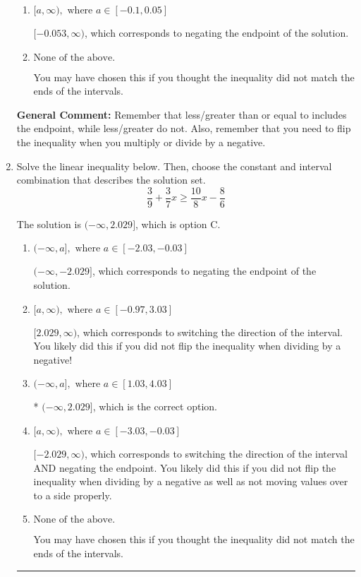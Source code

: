 \documentclass{extbook}[14pt]
\newcommand{\litem}[1]{\item #1

\rule{\textwidth}{0.4pt}}
\begin{document}
\begin{enumerate}
{\begin{enumerate}[label=\Alph*.]
 $(-\infty, -0.053]$, which corresponds to switching the direction of the interval AND negating the endpoint. You likely did this if you did not flip the inequality when dividing by a negative as well as not moving values over to a side properly.
\item \( [a, \infty), \text{ where } a \in [-0.1, 0.05] \)

 $[-0.053, \infty)$, which corresponds to negating the endpoint of the solution.
\item \( \text{None of the above}. \)

You may have chosen this if you thought the inequality did not match the ends of the intervals.
\end{enumerate}

\textbf{General Comment:} Remember that less/greater than or equal to includes the endpoint, while less/greater do not. Also, remember that you need to flip the inequality when you multiply or divide by a negative.
}
\litem{
Solve the linear inequality below. Then, choose the constant and interval combination that describes the solution set.
\[ \frac{3}{9} + \frac{3}{7} x \geq \frac{10}{8} x - \frac{8}{6} \]

The solution is \( (-\infty, 2.029] \), which is option C.\begin{enumerate}[label=\Alph*.]
\item \( (-\infty, a], \text{ where } a \in [-2.03, -0.03] \)

 $(-\infty, -2.029]$, which corresponds to negating the endpoint of the solution.
\item \( [a, \infty), \text{ where } a \in [-0.97, 3.03] \)

 $[2.029, \infty)$, which corresponds to switching the direction of the interval. You likely did this if you did not flip the inequality when dividing by a negative!
\item \( (-\infty, a], \text{ where } a \in [1.03, 4.03] \)

* $(-\infty, 2.029]$, which is the correct option.
\item \( [a, \infty), \text{ where } a \in [-3.03, -0.03] \)

 $[-2.029, \infty)$, which corresponds to switching the direction of the interval AND negating the endpoint. You likely did this if you did not flip the inequality when dividing by a negative as well as not moving values over to a side properly.
\item \( \text{None of the above}. \)

You may have chosen this if you thought the inequality did not match the ends of the intervals.
\end{enumerate}

}
\end{enumerate}
\end{document}
